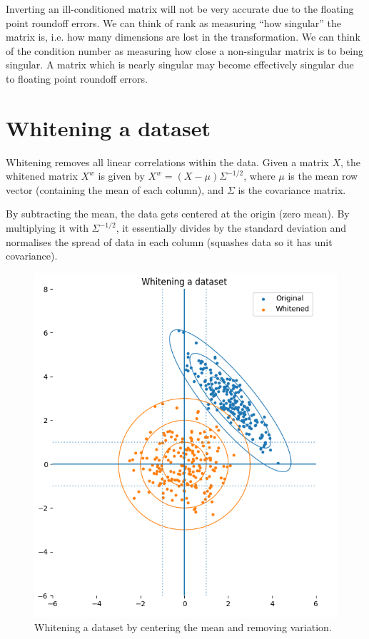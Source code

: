 \documentclass[a4paper, openany]{memoir}
\begin{document}
    Inverting an ill-conditioned matrix will not be very accurate due to the floating point roundoff errors. We can think of rank as measuring ``how singular'' the matrix is, i.e. how many dimensions are lost in the transformation. We can think of the condition number as measuring how close a non-singular matrix is to being singular. A matrix which is nearly singular may become effectively singular due to floating point roundoff errors.

    \section{Whitening a dataset}
    Whitening removes all linear correlations within the data. Given a matrix $X$, the whitened matrix $X^w$ is given by $X^w = (X - \mu) \Sigma^{-1/2}$, where $\mu$ is the mean row vector (containing the mean of each column), and $\Sigma$ is the covariance matrix.

    By subtracting the mean, the data gets centered at the origin (zero mean). By multiplying it with $\Sigma^{-1/2}$, it essentially divides by the standard deviation and normalises the spread of data in each column (squashes data so it has unit covariance).
    \begin{figure}[H]
        \centering
        \includegraphics[scale=0.5]{src/3.34 Whitening dataset.png}
        \caption{Whitening a dataset by centering the mean and removing variation.}
    \end{figure}
\end{document}
